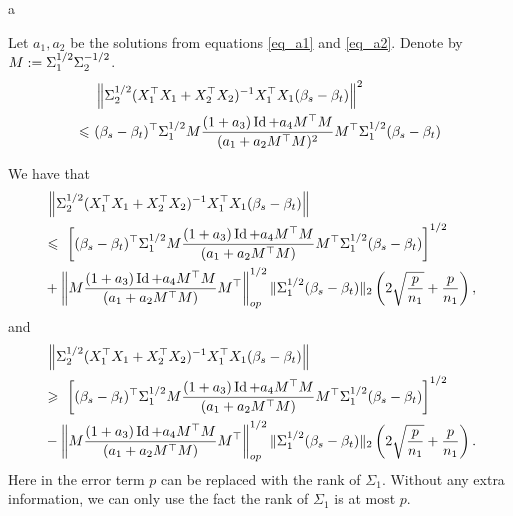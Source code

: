 \begin{theorem}
	a
\end{theorem}

\begin{theorem}
\end{theorem}

\begin{lemma}
	Let $a_1, a_2$ be the solutions from equations \eqref{eq_a1} and \eqref{eq_a2}.
	Denote by $M := \Sigma_1^{1/2}\Sigma_2^{-1/2}$.
	\begin{align*}
		&~ \left\| \Sigma_2^{1/2} (X_1^{\top}X_1 + X_2^{\top}X_2)^{-1}X_1^{\top}X_1(\beta_s - \beta_t) \right\|^2 \\
		\leqslant &~ (\beta_s - \beta_t)^{\top} \Sigma_1^{1/2} M \frac{(1 + a_3)\operatorname{Id} + a_4 M^{\top}M}{(a_1 + a_2 M^{\top}M)^2} M^{\top} \Sigma_1^{1/2} (\beta_s - \beta_t)
	\end{align*}


	We have that
	\begin{align*}
		&~ {\left\| \Sigma_2^{1/2} (X_1^{\top}X_1 + X_2^{\top}X_2)^{-1} X_1^{\top}X_1 (\beta_s - \beta_t) \right\|} \\
		&\leqslant ~ \left[(\beta_s - \beta_t)^{\top}\Sigma_1^{1/2}M\frac{(1 + a_3)\operatorname{Id} + a_4 M^{\top}M}{(a_1 + a_2 M^{\top}M)} M^{\top}\Sigma_1^{1/2} (\beta_s - \beta_t)\right]^{1/2} \\
		&+ \left\|M\frac{(1 + a_3)\operatorname{Id} + a_4 M^{\top}M}{(a_1 + a_2 M^{\top}M)} M^{\top}\right\|_{op}^{1/2} \|\Sigma_1^{1/2} (\beta_s - \beta_t)\|_2 \left( 2\sqrt{\frac{p} {n_1}} + \frac{p}{n_1}\right),
	\end{align*}
	and
	\begin{align*}
		&~ {\left\| \Sigma_2^{1/2} (X_1^{\top}X_1 + X_2^{\top}X_2)^{-1} X_1^{\top}X_1 (\beta_s - \beta_t) \right\|} \\
		&\geqslant ~ \left[(\beta_s - \beta_t)^{\top}\Sigma_1^{1/2}M\frac{(1 + a_3)\operatorname{Id} + a_4 M^{\top}M}{(a_1 + a_2 M^{\top}M)} M^{\top}\Sigma_1^{1/2} (\beta_s - \beta_t)\right]^{1/2} \\
		&- \left\|M\frac{(1 + a_3)\operatorname{Id} + a_4 M^{\top}M}{(a_1 + a_2 M^{\top}M)} M^{\top}\right\|_{op}^{1/2} \|\Sigma_1^{1/2} (\beta_s - \beta_t)\|_2 \left( 2\sqrt{\frac{p} {n_1}} + \frac{p}{n_1}\right).
	\end{align*}
	Here in the error term $p$ can be replaced with the rank of $\Sigma_1$. Without any extra information, we can only use the fact the rank of $\Sigma_1$ is at most $p$.
	

\end{lemma}
